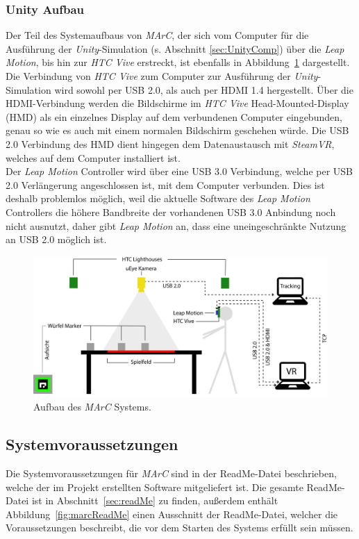 \subsubsection{Unity Aufbau}
Der Teil des Systemaufbaus von \emph{MArC}, der sich vom Computer für die Ausführung der \emph{Unity}-Simulation (s. Abschnitt \ref{sec:UnityComp}) über die \emph{Leap Motion}, bis hin zur \emph{HTC Vive} erstreckt, ist ebenfalls in Abbildung~\ref{fig:AufbauMarc} dargestellt.\\
Die Verbindung von \emph{HTC Vive} zum Computer zur Ausführung der \emph{Unity}-Simulation wird sowohl per USB 2.0, als auch per HDMI 1.4 hergestellt. Über die HDMI-Verbindung werden die Bildschirme im \emph{HTC Vive} Head-Mounted-Display (HMD) als ein einzelnes Display auf dem verbundenen Computer eingebunden, genau so wie es auch mit einem normalen Bildschirm geschehen würde. Die USB 2.0 Verbindung des HMD dient hingegen dem Datenaustausch mit \emph{SteamVR}, welches auf dem Computer installiert ist.\\
Der \emph{Leap Motion} Controller wird über eine USB 3.0 Verbindung, welche per USB 2.0 Verlängerung angeschlossen ist, mit dem Computer verbunden. Dies ist deshalb problemlos möglich, weil die aktuelle Software des \emph{Leap Motion} Controllers die höhere Bandbreite der vorhandenen USB 3.0 Anbindung noch nicht ausnutzt, daher gibt \emph{Leap Motion} an, dass eine uneingeschränkte Nutzung an USB 2.0 möglich ist.~\cite{website:LeapMotionSupportQuestion}

\begin{figure}[H]
	\centering
	\includegraphics[width=\textwidth]{Bilder/Aufbau_MArC.jpg}
	\caption{Aufbau des \textit{MArC} Systems.}
	\label{fig:AufbauMarc}
\end{figure}


\subsection{Systemvoraussetzungen}\label{sec:sysVor}
Die Systemvoraussetzungen für \emph{MArC} sind in der ReadMe-Datei beschrieben, welche der im Projekt erstellten Software mitgeliefert ist. Die gesamte ReadMe-Datei ist in Abschnitt~\ref{sec:readMe} zu finden, außerdem enthält Abbildung~\ref{fig:marcReadMe} einen Ausschnitt der ReadMe-Datei, welcher die Voraussetzungen beschreibt, die vor dem Starten des Systems erfüllt sein müssen.

